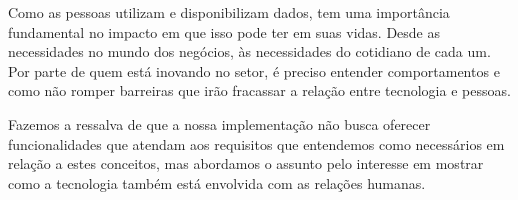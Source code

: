 Como as pessoas utilizam e disponibilizam dados, tem uma importância fundamental no impacto em que isso pode ter em suas vidas. Desde as necessidades no mundo dos negócios, às necessidades do cotidiano de cada um. Por parte de quem está inovando no setor, é preciso entender comportamentos e como não romper barreiras que irão fracassar a relação entre tecnologia e pessoas. 

Fazemos a ressalva de que a nossa implementação não busca oferecer funcionalidades que atendam aos requisitos que entendemos como necessários em relação a estes conceitos, mas abordamos o assunto pelo interesse em mostrar como a tecnologia também está envolvida com as relações humanas.
